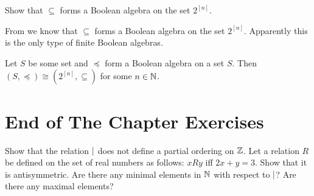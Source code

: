 \begin{exercise}
\label{exercise:set-boolean-algebra}
  Show that $\subseteq$ forms a Boolean algebra on the set $2^{[n]}$.
\end{exercise}

From  we know that $\subseteq$ forms a Boolean
algebra on the set $2^{[n]}$. Apparently this is the only type of finite Boolean
algebras.
\begin{theorem}
  Let $S$ be some set and $\preceq$ form a Boolean algebra on a set $S$.
  Then $(S, \preceq) \cong (2^{[n]}, \subseteq)$ for some $n \in \mathbb{N}$.
\end{theorem}


\section*{End of The Chapter Exercises}
\begin{exercises}
  \exerciseitem Show that the relation $\mid$ does not define a partial
    ordering on $\mathbb{Z}$.
  \exerciseitem Let a relation $R$ be defined on the set of real numbers as
    follows: $x R y$ iff $2x + y = 3$. Show that it is antisymmetric.
  \exerciseitem Are there any minimal elements in $\mathbb{N}$ with respect to
    $\mid$? Are there any maximal elements?
\end{exercises}
